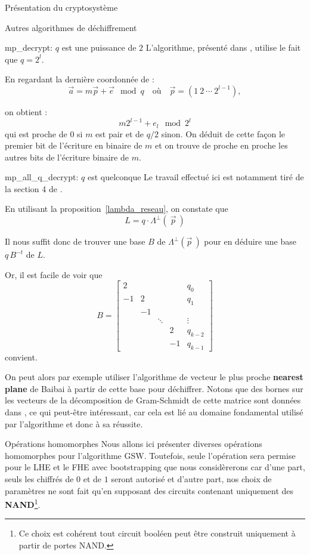 \begin{section}{Présentation du cryptosystème}
\begin{subsection}{Autres algorithmes de déchiffrement}
\begin{subsubsection}{mp\_decrypt: $q$ est une puissance de $2$}
	L'algorithme, présenté dans \cite{EPRINT:GenSahWat13}, utilise le fait que $q = 2^l$.

	En regardant la dernière coordonnée de :
\[\vec{a} = m \vec{p} + \vec{e} \mod q\quad \text{où}\quad \vec{p} = (1\:2\:\cdots\:2^{l-1}), \]
 
	on obtient :
\[m 2^{l-1} + e_{l} \mod 2^l \]
	qui est proche de 0 si $m$ est pair et de $q/2$ sinon. On déduit de cette façon le premier bit de l'écriture en
	binaire de $m$ et on trouve de proche en proche les autres bits de l'écriture binaire de $m$.
	
\end{subsubsection}
\begin{subsubsection}{mp\_all\_q\_decrypt: $q$ est quelconque}
	Le travail effectué ici est notamment tiré de la section 4 de \cite{EC:MicPei12}.

	En utilisant la proposition~\ref{lambda_reseau}, on constate que
\[ L = q \cdot \Lambda^\bot\left(\:\vec{p}\:\right) \]

	Il nous suffit donc de trouver une base $B$ de $\Lambda^\bot\left(\vec{p}\:\right)$ pour en déduire une base $q \, B^{-t}$ de $L$.

	Or, il est facile de voir que
\[ B = \begin{bmatrix} 
	2 & &&& q_0\\  
	-1 & 2 &&& q_1\\
   & -1 \\ 
	&    & \ddots & & \vdots \\
	&    &       &  2 & q_{k-2} \\
	&    &       &  -1 & q_{k-1}
\end{bmatrix}\]
convient.

On peut alors par exemple utiliser l'algorithme de vecteur le plus proche \textbf{nearest plane} de Baibai à partir de
cette base pour déchiffrer. Notons que des bornes sur les vecteurs de la décomposition de Gram-Schmidt de cette matrice
sont données dans \cite{EC:MicPei12}, ce qui peut-être intéressant, car cela est lié au domaine fondamental utilisé par
l'algorithme et donc à sa réussite.

\end{subsubsection}	
\end{subsection}

\begin{subsection}{Opérations homomorphes}
Nous allons ici présenter diverses opérations homomorphes pour l'algorithme GSW. Toutefois, seule l'opération
 sera permise pour le LHE et le FHE avec bootstrapping que nous considèrerons car d'une part, seuls les
chiffrés de $0$ et de $1$ seront autorisé et d'autre part, nos choix de paramètres ne sont fait qu'en supposant des
circuits contenant uniquement des \textbf{NAND}\footnote{Ce choix est cohérent tout circuit booléen peut être construit
uniquement à partir de portes  NAND.}.



\end{subsection}
\end{section}
